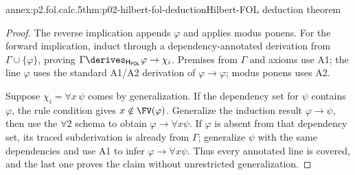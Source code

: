 \begin{annexitem}{annex:p2.fol.calc.5}{thm:p02-hilbert-fol-deduction}{Hilbert-FOL deduction theorem}
\begin{proof}
The reverse implication appends \(\varphi\) and applies modus ponens.  For
the forward implication, induct through a dependency-annotated derivation
from \(\Gamma\cup\{\varphi\}\), proving
\(\Gamma\derives_{\mathsf H_{\mathsf{FOL}}}\varphi\to\chi_i\).
Premises from \(\Gamma\) and axioms use A1; the line \(\varphi\) uses the
standard A1/A2 derivation of \(\varphi\to\varphi\); modus ponens uses A2.

Suppose \(\chi_i=\forall x\,\psi\) comes by generalization.  If the
dependency set for \(\psi\) contains \(\varphi\), the rule condition gives
\(x\notin\FV(\varphi)\).  Generalize the induction result
\(\varphi\to\psi\), then use the \(\forall2\) schema to obtain
\(\varphi\to\forall x\psi\).  If \(\varphi\) is absent from that dependency
set, its traced subderivation is already from \(\Gamma\); generalize
\(\psi\) with the same dependencies and use A1 to infer
\(\varphi\to\forall x\psi\).  Thus every annotated line is covered, and the
last one proves the claim without unrestricted generalization.
\end{proof}
\end{annexitem}
